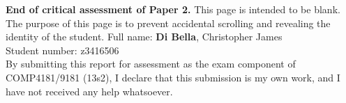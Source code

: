 \documentclass[9pt]{report}
\begin{document}
\noindent
{\bf End of critical assessment of Paper 2.}
\clearpage
\noindent
This page is intended to be blank.\\

\noindent
The purpose of this page is to prevent accidental scrolling and revealing the identity of the student.
\clearpage
\noindent
Full name: \hspace{8mm} {\bf Di Bella}, Christopher James\\
Student number: z3416506\\

\noindent
By submitting this report for assessment as the exam component of COMP4181/9181 (13s2), I declare that this submission is my own work, and I have not received any help whatsoever.
\end{document}
